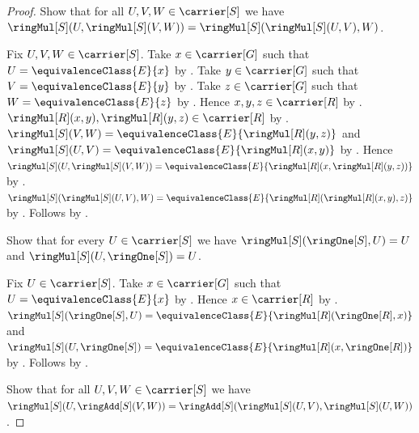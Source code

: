\begin{proof}
    Show that for all $U,V,W\in\carrier[S]$ we have
        $\ringMul[S](U,\ringMul[S](V,W))
            =\ringMul[S](\ringMul[S](U,V),W)$.
    \begin{subproof}
        Fix $U,V,W\in\carrier[S]$.
        Take $x\in\carrier[G]$ such that
            $U=\equivalenceClass{E}{x}$ by
            .
        Take $y\in\carrier[G]$ such that
            $V=\equivalenceClass{E}{y}$ by
            .
        Take $z\in\carrier[G]$ such that
            $W=\equivalenceClass{E}{z}$ by
            .
        Hence $x,y,z\in\carrier[R]$ by
            .
        $\ringMul[R](x,y),\ringMul[R](y,z)\in\carrier[R]$ by
            .
        $\ringMul[S](V,W)=
            \equivalenceClass{E}{\ringMul[R](y,z)}$ and
            $\ringMul[S](U,V)=
            \equivalenceClass{E}{\ringMul[R](x,y)}$ by
            .
        Hence
            $\ringMul[S](U,\ringMul[S](V,W))=
                \equivalenceClass{E}{
                    \ringMul[R](x,\ringMul[R](y,z))}$ by
            .
        $\ringMul[S](\ringMul[S](U,V),W)=
            \equivalenceClass{E}{
                \ringMul[R](\ringMul[R](x,y),z)}$ by
            .
        Follows by .
    \end{subproof}
    Show that for every $U\in\carrier[S]$ we have
        $\ringMul[S](\ringOne[S],U)=U$ and
        $\ringMul[S](U,\ringOne[S])=U$.
    \begin{subproof}
        Fix $U\in\carrier[S]$.
        Take $x\in\carrier[G]$ such that
            $U=\equivalenceClass{E}{x}$ by
            .
        Hence $x\in\carrier[R]$ by
            .
        $\ringMul[S](\ringOne[S],U)=
            \equivalenceClass{E}{\ringMul[R](\ringOne[R],x)}$ and
            $\ringMul[S](U,\ringOne[S])=
            \equivalenceClass{E}{\ringMul[R](x,\ringOne[R])}$ by
            .
        Follows by .
    \end{subproof}
    Show that for all $U,V,W\in\carrier[S]$ we have
        $\ringMul[S](U,\ringAdd[S](V,W))
            =\ringAdd[S](\ringMul[S](U,V),\ringMul[S](U,W))$.

\end{proof}
